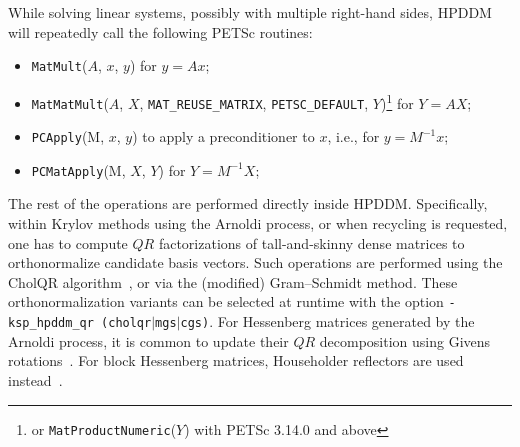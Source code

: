 \documentclass[3p,11pt]{elsarticle}
\newcommand{\pk}[1]{\texttt{#1}}
\begin{document}
While solving linear systems, possibly with multiple right-hand sides, HPDDM will repeatedly call the following PETSc routines:
\begin{itemize}
    \item \pk{MatMult}($A$, $x$, $y$) for $y = Ax$;
    \item \pk{MatMatMult}($A$, $X$, \pk{MAT\_REUSE\_MATRIX}, 
        \pk{PETSC\_DEFAULT}, $Y$)\footnote{or \pk{MatProductNumeric}($Y$) with PETSc 3.14.0 and above} for $Y =
        AX$;
    \item \pk{PCApply}(M, $x$, $y$) to apply a preconditioner to $x$, i.e., for $y = M^{-1}x$;
    \item \pk{PCMatApply}(M, $X$, $Y$) for $Y = M^{-1}X$;
\end{itemize}
The rest of the operations are performed directly inside HPDDM.  Specifically,
within Krylov methods using the Arnoldi process, or when recycling is
requested, one has to compute $QR$ factorizations of tall-and-skinny dense
matrices to orthonormalize candidate basis vectors. Such operations are
performed using the CholQR algorithm~\cite{stathopoulos2002block}, or via the
(modified) Gram--Schmidt method.  These orthonormalization variants can be
selected at runtime with the option \pk{-ksp\_hpddm\_qr (cholqr$|$mgs$|$cgs)}.
For Hessenberg matrices generated by the Arnoldi process, it is common to
update their $QR$ decomposition using Givens
rotations~\cite{saad2003iterative}. For block Hessenberg matrices, Householder
reflectors are used instead~\cite{gutknecht2008updating}.
\end{document}
